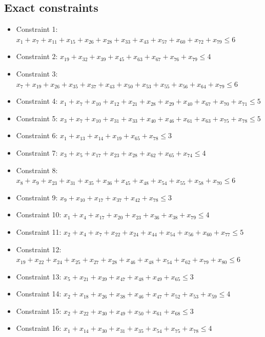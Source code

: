 \documentclass[11pt]{article}
\begin{document}
\subsection*{Exact constraints}
\begin{itemize}
\item Constraint 1: $x_{1} + x_{7} + x_{11} + x_{15} + x_{26} + x_{28} + x_{33} + x_{43} + x_{57} + x_{60} + x_{72} + x_{79} \le 6$
\item Constraint 2: $x_{19} + x_{32} + x_{39} + x_{45} + x_{63} + x_{67} + x_{76} + x_{79} \le 4$
\item Constraint 3: $x_{7} + x_{19} + x_{26} + x_{35} + x_{37} + x_{43} + x_{50} + x_{53} + x_{55} + x_{56} + x_{64} + x_{79} \le 6$
\item Constraint 4: $x_{1} + x_{7} + x_{10} + x_{12} + x_{21} + x_{28} + x_{29} + x_{40} + x_{67} + x_{70} + x_{71} \le 5$
\item Constraint 5: $x_{3} + x_{7} + x_{10} + x_{31} + x_{33} + x_{40} + x_{46} + x_{61} + x_{63} + x_{75} + x_{78} \le 5$
\item Constraint 6: $x_{1} + x_{13} + x_{14} + x_{19} + x_{65} + x_{78} \le 3$
\item Constraint 7: $x_{3} + x_{5} + x_{17} + x_{23} + x_{28} + x_{62} + x_{65} + x_{74} \le 4$
\item Constraint 8: $x_{8} + x_{9} + x_{23} + x_{31} + x_{35} + x_{36} + x_{45} + x_{48} + x_{54} + x_{55} + x_{58} + x_{70} \le 6$
\item Constraint 9: $x_{9} + x_{10} + x_{17} + x_{37} + x_{42} + x_{78} \le 3$
\item Constraint 10: $x_{1} + x_{4} + x_{17} + x_{20} + x_{23} + x_{36} + x_{38} + x_{79} \le 4$
\item Constraint 11: $x_{2} + x_{4} + x_{7} + x_{22} + x_{24} + x_{44} + x_{54} + x_{56} + x_{60} + x_{77} \le 5$
\item Constraint 12: $x_{19} + x_{22} + x_{24} + x_{25} + x_{27} + x_{28} + x_{46} + x_{48} + x_{54} + x_{62} + x_{79} + x_{80} \le 6$
\item Constraint 13: $x_{5} + x_{21} + x_{39} + x_{47} + x_{48} + x_{49} + x_{65} \le 3$
\item Constraint 14: $x_{2} + x_{18} + x_{26} + x_{38} + x_{46} + x_{47} + x_{52} + x_{53} + x_{59} \le 4$
\item Constraint 15: $x_{2} + x_{22} + x_{30} + x_{49} + x_{50} + x_{61} + x_{68} \le 3$
\item Constraint 16: $x_{1} + x_{14} + x_{30} + x_{31} + x_{35} + x_{54} + x_{75} + x_{78} \le 4$

\end{itemize}
\end{document}
